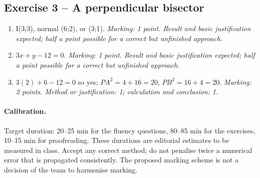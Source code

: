 \subsection*{Exercise 3 -- A perpendicular bisector}
\begin{enumerate}
\item I(3;3), normal (6;2), or (3;1). \textit{Marking: 1 point. Result and basic justification expected; half a point possible for a correct but unfinished approach.}
\item $3x+y-12=0$. \textit{Marking: 1 point. Result and basic justification expected; half a point possible for a correct but unfinished approach.}
\item $3(2)+6-12=0$ so yes; $PA^2=4+16=20$, $PB^2=16+4=20$. \textit{Marking: 2 points. Method or justification: 1; calculation and conclusion: 1.}
\end{enumerate}
\paragraph{Calibration.} Target duration: 20--25 min for the fluency questions, 80--85 min for the exercises, 10--15 min for proofreading. These durations are editorial estimates to be measured in class. Accept any correct method; do not penalise twice a numerical error that is propagated consistently. The proposed marking scheme is not a decision of the team to harmonise marking.
